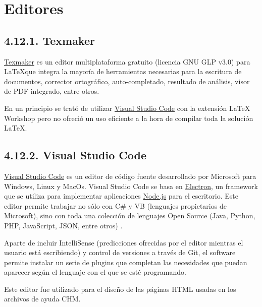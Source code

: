 \section{Editores}

\subsection{4.12.1. Texmaker}

\href{http://www.xm1math.net/texmaker/}{Texmaker} es un editor multiplataforma gratuito (licencia GNU GLP v3.0) para \LaTeX que integra la mayoría de herramientas necesarias para la escritura de documentos, corrector ortográfico, auto-completado, resultado de análisis, visor de PDF integrado, entre otros.

En un principio se trató de utilizar \href{https://code.visualstudio.com/}{Visual Studio Code} con la extensión LaTeX Workshop pero no ofreció un uso eficiente a la hora de compilar toda la solución \LaTeX.

\subsection{4.12.2. Visual Studio Code}

\href{https://code.visualstudio.com/}{Visual Studio Code} es un editor de código fuente desarrollado por Microsoft para Windows, Linux y MacOs. Visual Studio Code se basa en \href{https://electronjs.org/}{Electron}, un framework que se utiliza para implementar aplicaciones \href{https://nodejs.org/es/}{Node.js} para el escritorio. Este editor permite trabajar no sólo con C\# y VB (lenguajes propietarios de Microsoft), sino con toda una colección de lenguajes Open Source (Java, Python, PHP, JavaScript, JSON, entre otros) \cite{web:vsCode}.

Aparte de incluir IntelliSense (predicciones ofrecidas por el editor mientras el usuario está escribiendo) y control de versiones a través de Git, el software permite instalar un serie de plugins que completan las necesidades que puedan aparecer según el lenguaje con el que se esté programando.

Este editor fue utilizado para el diseño de las páginas HTML usadas en los archivos de ayuda CHM.